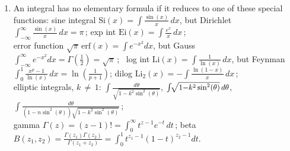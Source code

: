 \documentclass[10pt]{article}
\begin{document}
\begin{enumerate}
See \S7.4 for higher terms if $h(x)$ has factors  $(x{-}a)^n$
or irreducible $(ax^2{+}bx{+}c)^n$.

\item An integral has no elementary formula if it reduces to one of these special functions:
sine integral $\text{Si}(x) = \int \frac{\sin(x)}{x}\,dx$,
but Dirichlet $\int_{-\infty}^\infty\! \frac{\sin(x)}x\,dx = \pi$\,; 
exp int $\text{Ei}(x) = \int \!\frac{e^x}{x}\,dx$\,; \\
error function $\sqrt\pi\,\text{erf}(x) = \int\! e^{-x^2} dx$,
but Gauss \mbox{$\int_{-\infty}^\infty e^{-x^2} dx=\Gamma(\frac12)=\sqrt{\pi}$\,; }
log int $\text{Li}(x) = \int\! \frac1{\ln(x)}\,dx$,
but Feynman $\int_0^1\! \frac{x^p-1}{\ln(x)}\,dx = \ln(\frac{1}{p+1})$;
dilog $\text{Li}_2(x) = -\int\! \frac{\ln(1-x)}x\,dx$\,;\\
elliptic integrals, $k\,{\neq}\, 1$: 
$\int\!\! \frac{d\theta}{\sqrt{1-k^2\sin^2(\theta)}}$,
$\int\!\! \mbox{\small $\sqrt{1{-}k^2\sin^2(\theta)}\, d\theta$}$,
$\int\!\! \frac{d\theta}
{(1-n\sin^2(\theta)) \sqrt{1-k^2\sin^2(\theta)} }$\,; \\
gamma $\Gamma(z) = (z{-}1)! = \int_0^\infty t^{z-1} e^{-t}\,dt$\,; 
beta $B(z_1,z_2) = \frac{\Gamma(z_1)\Gamma(z_2)}{\Gamma(z_1+z_2)}
=\int_0^1 t^{z_1-1}(1{-}t)^{z_2-1}dt$.

\end{enumerate}

\vspace{-3em}
\end{document}
